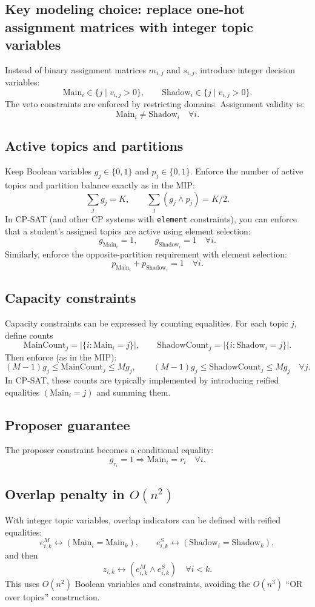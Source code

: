 \documentclass[12pt]{article}
\begin{document}
	\subsection{Key modeling choice: replace one-hot assignment matrices with integer topic variables}
	Instead of binary assignment matrices $m_{i,j}$ and $s_{i,j}$, introduce integer decision variables:
	\[
		\text{Main}_i \in \{ j \mid v_{i,j} > 0 \}, \qquad \text{Shadow}_i \in \{ j \mid v_{i,j} > 0 \}.
	\]
	The veto constraints are enforced by restricting domains. Assignment validity is:
	\[
		\text{Main}_i \ne \text{Shadow}_i \quad \forall i.
	\]

	\subsection{Active topics and partitions}
	Keep Boolean variables $g_j \in \{0,1\}$ and $p_j \in \{0,1\}$. Enforce the number of active topics and partition balance exactly as in the MIP:
	\[
		\sum_j g_j = K,\qquad \sum_j (g_j \wedge p_j) = K/2.
	\]
	In CP-SAT (and other CP systems with \texttt{element} constraints), you can enforce that a student's assigned topics are active using element selection:
	\[
		g_{\text{Main}_i} = 1,\qquad g_{\text{Shadow}_i} = 1 \quad \forall i.
	\]
	Similarly, enforce the opposite-partition requirement with element selection:
	\[
		p_{\text{Main}_i} + p_{\text{Shadow}_i} = 1 \quad \forall i.
	\]

	\subsection{Capacity constraints}
	Capacity constraints can be expressed by counting equalities. For each topic $j$, define counts
	\[
		\text{MainCount}_j = |\{ i : \text{Main}_i = j\}|,\qquad \text{ShadowCount}_j = |\{ i : \text{Shadow}_i = j\}|.
	\]
	Then enforce (as in the MIP):
	\[
		(M-1)g_j \le \text{MainCount}_j \le Mg_j,\qquad (M-1)g_j \le \text{ShadowCount}_j \le Mg_j \quad \forall j.
	\]
	In CP-SAT, these counts are typically implemented by introducing reified equalities $(\text{Main}_i=j)$ and summing them.

	\subsection{Proposer guarantee}
	The proposer constraint becomes a conditional equality:
	\[
		g_{r_i} = 1 \Rightarrow \text{Main}_i = r_i \quad \forall i.
	\]

	\subsection{Overlap penalty in $O(n^2)$}
	With integer topic variables, overlap indicators can be defined with reified equalities:
	\[
		e^{M}_{i,k} \leftrightarrow (\text{Main}_i = \text{Main}_k),\qquad e^{S}_{i,k} \leftrightarrow (\text{Shadow}_i = \text{Shadow}_k),
	\]
	and then
	\[
		z_{i,k} \leftrightarrow (e^{M}_{i,k} \wedge e^{S}_{i,k}) \quad \forall i<k.
	\]
	This uses $O(n^2)$ Boolean variables and constraints, avoiding the $O(n^3)$ ``OR over topics'' construction.
\end{document}
